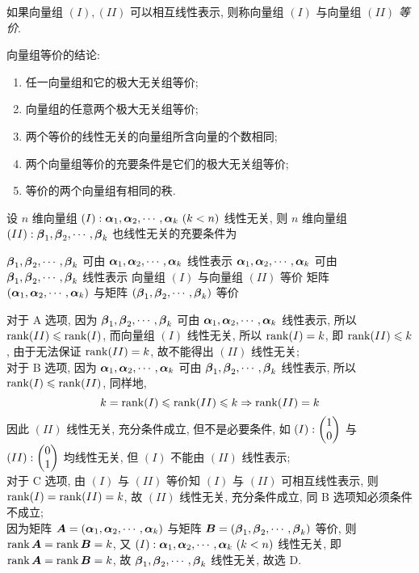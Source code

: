 \begin{definition}[向量组等价]
    如果向量组 $(I),(II)$ 可以相互线性表示, 则称向量组 $(I)$ 与向量组 $(II)$ \textit{等价}.
\end{definition}

向量组等价的结论:
\begin{enumerate}[label=(\arabic{*})]
    \item 任一向量组和它的极大无关组等价;
    \item 向量组的任意两个极大无关组等价;
    \item 两个等价的线性无关的向量组所含向量的个数相同;
    \item 两个向量组等价的充要条件是它们的极大无关组等价;
    \item 等价的两个向量组有相同的秩.
\end{enumerate}

\begin{example}
    设 $n$ 维向量组 $(I):\vb*{\alpha}_1,\vb*{\alpha}_2,\cdots,\vb*{\alpha}_k~ (k<n)$ 线性无关, 则 $n$ 维向量组 $(II):\vb*{\beta}_1,\vb*{\beta}_2,\cdots,\vb*{\beta}_k$ 也线性无关的充要条件为
    \begin{tasks}
        \task $\vb*{\beta}_1,\vb*{\beta}_2,\cdots,\vb*{\beta}_k$ 可由 $\vb*{\alpha}_1,\vb*{\alpha}_2,\cdots,\vb*{\alpha}_k$ 线性表示
        \task $\vb*{\alpha}_1,\vb*{\alpha}_2,\cdots,\vb*{\alpha}_k$ 可由 $\vb*{\beta}_1,\vb*{\beta}_2,\cdots,\vb*{\beta}_k$ 线性表示
        \task 向量组 $(I)$ 与向量组 $(II)$ 等价
        \task 矩阵 $(\vb*{\alpha}_1,\vb*{\alpha}_2,\cdots,\vb*{\alpha}_k)$ 与矩阵 $(\vb*{\beta}_1,\vb*{\beta}_2,\cdots,\vb*{\beta}_k)$ 等价
    \end{tasks}
\end{example}
\begin{solution}
    对于 A 选项, 因为 $\vb*{\beta}_1,\vb*{\beta}_2,\cdots,\vb*{\beta}_k$ 可由 $\vb*{\alpha}_1,\vb*{\alpha}_2,\cdots,\vb*{\alpha}_k$ 线性表示, 所以 $\rank(II)\leqslant \rank(I)$, 而向量组 $(I)$ 线性无关, 
    所以 $\rank(I)=k$, 即 $\rank(II)\leqslant k$, 由于无法保证 $\rank(II)=k$, 故不能得出 $(II)$ 线性无关;\\
    对于 B 选项, 因为 $\vb*{\alpha}_1,\vb*{\alpha}_2,\cdots,\vb*{\alpha}_k$ 可由 $\vb*{\beta}_1,\vb*{\beta}_2,\cdots,\vb*{\beta}_k$ 线性表示, 所以 $\rank(I)\leqslant \rank(II)$, 同样地, 
    $$k=\rank(I)\leqslant\rank(II)\leqslant k\Rightarrow \rank(II)=k$$
    因此 $(II)$ 线性无关, 充分条件成立, 但不是必要条件, 如 $(I):\mqty(1\\0)$ 与 $(II):\mqty(0\\1)$ 均线性无关, 但 $(I)$ 不能由 $(II)$ 线性表示;\\
    对于 C 选项, 由 $(I)$ 与 $(II)$ 等价知 $(I)$ 与 $(II)$ 可相互线性表示, 则 $\rank(I)=\rank(II)=k$, 故 $(II)$ 线性无关, 充分条件成立, 同 B 选项知必须条件不成立;\\
    因为矩阵 $\vb*{A}=(\vb*{\alpha}_1,\vb*{\alpha}_2,\cdots,\vb*{\alpha}_k)$ 与矩阵 $\vb*{B}=(\vb*{\beta}_1,\vb*{\beta}_2,\cdots,\vb*{\beta}_k)$ 等价, 则 $\rank\vb*{A}=\rank\vb*{B}=k$, 
    又 $(I):\vb*{\alpha}_1,\vb*{\alpha}_2,\cdots,\vb*{\alpha}_k~ (k<n)$ 线性无关, 即 $\rank\vb*{A}=\rank\vb*{B}=k$, 故 $\vb*{\beta}_1,\vb*{\beta}_2,\cdots,\vb*{\beta}_k$ 线性无关, 故选 D.
\end{solution}

